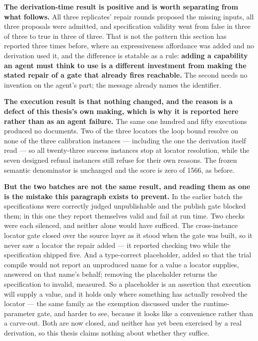 \textbf{The derivation-time result is positive and is worth separating from what follows.}
All three replicates' repair rounds proposed the missing inputs, all three proposals were
admitted, and specification validity went from false in three of three to true in three of
three. That is not the pattern this section has reported three times before, where an
expressiveness affordance was added and no derivation used it, and the difference is
statable as a rule: \textbf{adding a capability an agent must think to use is a different
investment from making the stated repair of a gate that already fires reachable.} The second
needs no invention on the agent's part; the message already names the identifier.

\textbf{The execution result is that nothing changed, and the reason is a defect of this
thesis's own making, which is why it is reported here rather than as an agent failure.} The
same one hundred and fifty executions produced no documents. Two of the three locators the
loop bound resolve on none of the three calibration instances --- including the one the
derivation itself read --- so all twenty-three success instances stop at locator resolution,
while the seven designed refusal instances still refuse for their own reasons. The frozen
semantic denominator is unchanged and the score is zero of 1566, as before.

\textbf{But the two batches are not the same result, and reading them as one is the mistake
this paragraph exists to prevent.} In the earlier batch the specifications were correctly
judged unpublishable and the publish gate blocked them; in this one they report themselves
valid and fail at run time. Two checks were each silenced, and neither alone would have
sufficed. The cross-instance locator gate closed over the source layer as it stood when the
gate was built, so it never saw a locator the repair added --- it reported checking two while
the specification shipped five. And a type-correct placeholder, added so that the trial
compile would not report an unproduced name for a value a locator supplies, answered on that
name's behalf; removing the placeholder returns the specification to invalid, measured. So a
placeholder is an assertion that execution will supply a value, and it holds only where
something has actually resolved the locator --- the same family as the exemption discussed
under the runtime-parameter gate, and harder to see, because it looks like a convenience
rather than a carve-out. Both are now closed, and neither has yet been exercised by a real
derivation, so this thesis claims nothing about whether they suffice.

